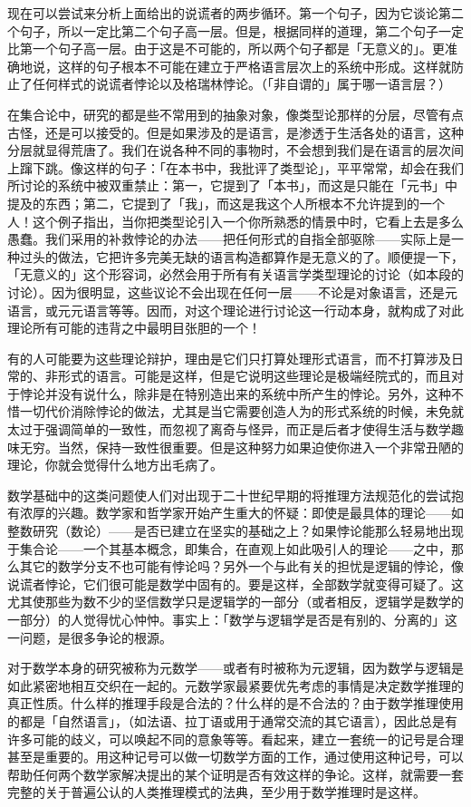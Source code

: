 \documentclass[
  12pt,
  twoside,
  openright,
  oldfontcommands,
]{memoir}
\begin{document}
现在可以尝试来分析上面给出的说谎者的两步循环。第一个句子，因为它谈论第二个句子，所以一定比第二个句子高一层。但是，根据同样的道理，第二个句子一定比第一个句子高一层。由于这是不可能的，所以两个句子都是「无意义的」。更准确地说，这样的句子根本不可能在建立于严格语言层次上的系统中形成。这样就防止了任何样式的说谎者悖论以及格瑞林悖论。（「非自谓的」属于哪一语言层？）

在集合论中，研究的都是些不常用到的抽象对象，像类型论那样的分层，尽管有点古怪，还是可以接受的。但是如果涉及的是语言，是渗透于生活各处的语言，这种分层就显得荒唐了。我们在说各种不同的事物时，不会想到我们是在语言的层次间上蹿下跳。像这样的句子：「在本书中，我批评了类型论」，平平常常，却会在我们所讨论的系统中被双重禁止：第一，它提到了「本书」，而这是只能在「元书」中提及的东西；第二，它提到了「我」，而这是我这个人所根本不允许提到的一个人！这个例子指出，当你把类型论引入一个你所熟悉的情景中时，它看上去是多么愚蠢。我们采用的补救悖论的办法------把任何形式的自指全部驱除------实际上是一种过头的做法，它把许多完美无缺的语言构造都算作是无意义的了。顺便提一下，「无意义的」这个形容词，必然会用于所有有关语言学类型理论的讨论（如本段的讨论）。因为很明显，这些议论不会出现在任何一层------不论是对象语言，还是元语言，或元元语言等等。因而，对这个理论进行讨论这一行动本身，就构成了对此理论所有可能的违背之中最明目张胆的一个！

有的人可能要为这些理论辩护，理由是它们只打算处理形式语言，而不打算涉及日常的、非形式的语言。可能是这样，但是它说明这些理论是极端经院式的，而且对于悖论并没有说什么，除非是在特别造出来的系统中所产生的悖论。另外，这种不惜一切代价消除悖论的做法，尤其是当它需要创造人为的形式系统的时候，未免就太过于强调简单的一致性，而忽视了离奇与怪异，而正是后者才使得生活与数学趣味无穷。当然，保持一致性很重要。但是这种努力如果迫使你进入一个非常丑陋的理论，你就会觉得什么地方出毛病了。

数学基础中的这类问题使人们对出现于二十世纪早期的将推理方法规范化的尝试抱有浓厚的兴趣。数学家和哲学家开始产生重大的怀疑：即使是最具体的理论------如整数研究（数论）------是否已建立在坚实的基础之上？如果悖论能那么轻易地出现于集合论------一个其基本概念，即集合，在直观上如此吸引人的理论------之中，那么其它的数学分支不也可能有悖论吗？另外一个与此有关的担忧是逻辑的悖论，像说谎者悖论，它们很可能是数学中固有的。要是这样，全部数学就变得可疑了。这尤其使那些为数不少的坚信数学只是逻辑学的一部分（或者相反，逻辑学是数学的一部分）的人觉得忧心忡忡。事实上：「数学与逻辑学是否是有别的、分离的」这一问题，是很多争论的根源。

对于数学本身的研究被称为元数学------或者有时被称为元逻辑，因为数学与逻辑是如此紧密地相互交织在一起的。元数学家最紧要优先考虑的事情是决定数学推理的真正性质。什么样的推理手段是合法的？什么样的是不合法的？由于数学推理使用的都是「自然语言」，（如法语、拉丁语或用于通常交流的其它语言），因此总是有许多可能的歧义，可以唤起不同的意象等等。看起来，建立一套统一的记号是合理甚至是重要的。用这种记号可以做一切数学方面的工作，通过使用这种记号，可以帮助任何两个数学家解决提出的某个证明是否有效这样的争论。这样，就需要一套完整的关于普遍公认的人类推理模式的法典，至少用于数学推理时是这样。
\end{document}
